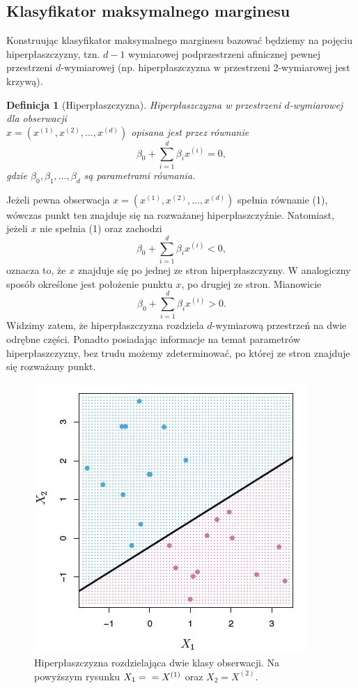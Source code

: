 \documentclass[a4paper]{article}
\newtheorem{defi} {Definicja}
\begin{document}
\subsection{Klasyfikator maksymalnego marginesu}
Konstruując klasyfikator maksymalnego marginesu bazować będziemy na pojęciu hiperpłaszczyzny, tzn. $d-1$ wymiarowej podprzestrzeni afinicznej pewnej przestrzeni $d$-wymiarowej (np. hiperpłaszczyzna w przestrzeni 2-wymiarowej jest krzywą).
\begin{defi}[Hiperpłaszczyzna]
Hiperpłaszczyzna w przestrzeni $d$-wymiarowej  dla obserwacji \\$x = (x^{(1)},x^{(2)},\dots,x^{(d)})$ opisana jest przez równanie 
\begin{equation}\label{(2.38)}
    \beta_0 + \sum\limits_{i=1}^d{\beta_ix^{(i)}} = 0,
\end{equation}
gdzie $\beta_0, \beta_1, \dots, \beta_d$ są parametrami równania.
\end{defi}
Jeżeli pewna obserwacja $x=(x^{(1)}, x^{(2)}, \dots, x^{(d)})$ spełnia równanie (1), wówczas punkt ten znajduje się na rozważanej hiperpłaszczyźnie. Natomiast, jeżeli $x$ nie spełnia (1) oraz zachodzi 
\begin{equation}
    \beta_0 + \sum\limits_{i=1}^d{\beta_ix^{(i)}} < 0,
\end{equation}
oznacza to, że $x$ znajduje się po jednej ze stron hiperpłaszczyzny. W analogiczny sposób określone jest położenie punktu $x$, po drugiej ze stron. Mianowicie 
\begin{equation}
\beta_0 + \sum\limits_{i=1}^d{\beta_ix^{(i)}} > 0.
\end{equation}
Widzimy zatem, że hiperpłaszczyzna rozdziela $d$-wymiarową przestrzeń na dwie odrębne  części. Ponadto posiadając informacje na temat parametrów hiperpłaszczyzny, bez trudu możemy zdeterminować, po której ze stron znajduje się rozważany punkt.
\begin{figure}[ht]
    \centering
    \includegraphics[width = 180 pt, height = 140 pt]{SVM!.JPG}
    \caption{Hiperpłaszczyzna rozdzielająca dwie klasy obserwacji. Na powyższym rysunku $X_1 =\\= X^{(1)}$ oraz $X_2 = X^{(2)}$.}
\end{figure}
\end{document}
